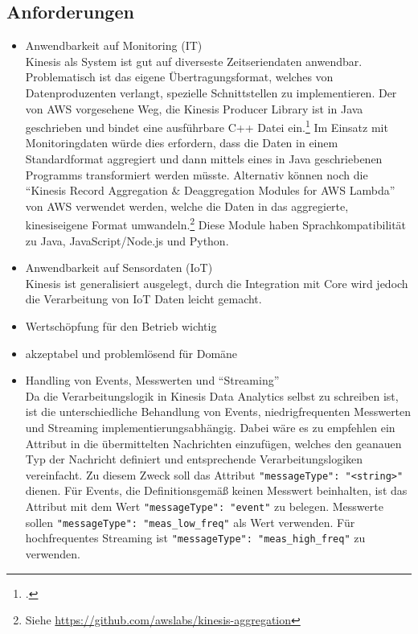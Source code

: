 \subsection{Anforderungen}
\begin{itemize}
\item Anwendbarkeit auf Monitoring (IT)\\
Kinesis als System ist gut auf diverseste Zeitseriendaten anwendbar. Problematisch ist das eigene Übertragungsformat, welches von Datenproduzenten verlangt, spezielle Schnittstellen zu implementieren. Der von \ac{AWS} vorgesehene Weg, die Kinesis Producer Library ist in Java geschrieben und bindet eine ausführbare C++ Datei ein.\footcite[Vgl.][]{AmazonWebServicesInc..o.J.bg} Im Einsatz mit Monitoringdaten würde dies erfordern, dass die Daten in einem Standardformat aggregiert und dann mittels eines in Java geschriebenen Programms transformiert werden müsste. Alternativ können noch die \enquote{Kinesis Record Aggregation \& Deaggregation Modules for AWS Lambda} von \ac{AWS} verwendet werden, welche die Daten in das aggregierte, kinesiseigene Format umwandeln.\footnote{Siehe \url{https://github.com/awslabs/kinesis-aggregation}} Diese Module haben Sprachkompatibilität zu Java, JavaScript/Node.js und Python.

\item Anwendbarkeit auf Sensordaten (\ac{IoT})\\
Kinesis ist generalisiert ausgelegt, durch die Integration mit \AWSIOT{} Core wird jedoch die Verarbeitung von \ac{IoT} Daten leicht gemacht. 

\item Wertschöpfung für den Betrieb wichtig\\
\item akzeptabel und problemlösend für Domäne\\
\item Handling von Events, Messwerten und \enquote{Streaming}\\
Da die Verarbeitungslogik in Kinesis Data Analytics selbst zu schreiben ist, ist die unterschiedliche Behandlung von Events, niedrigfrequenten Messwerten und Streaming implementierungsabhängig. Dabei wäre es zu empfehlen ein Attribut in die übermittelten Nachrichten einzufügen, welches den geanauen Typ der Nachricht definiert und entsprechende Verarbeitungslogiken vereinfacht. Zu diesem Zweck soll das Attribut \texttt{{"messageType": "<string>"}} dienen. Für Events, die Definitionsgemäß keinen Messwert beinhalten, ist das Attribut mit dem Wert \texttt{{"messageType": "event"}} zu belegen. Messwerte sollen \texttt{{"messageType": "meas_low_freq"}} als Wert verwenden. Für hochfrequentes Streaming ist \texttt{{"messageType": "meas_high_freq"}} zu verwenden.


\end{itemize}
